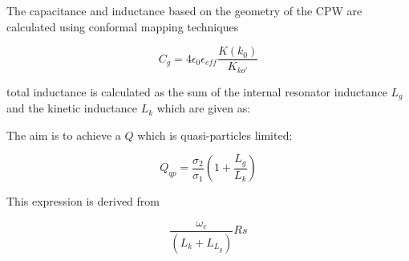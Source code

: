 The capacitance and inductance based on the geometry of the CPW are calculated using conformal mapping techniques 


\begin{equation}
\label{eq:quasilimited1}
C_{g}=4\epsilon_{0}\epsilon_{eff}\frac{K(k_{0})}{K_{ko'}}
\end{equation}








total inductance is calculated as the sum of the internal resonator inductance $L_{g}$ and the kinetic inductance $L_{k}$ which are given as: 




The aim is to achieve a $Q$ which is quasi-particles limited:

\begin{equation}
\label{eq:Qquasilimited}
Q_{qp} = \frac{\sigma_{2}}{\sigma_{1}} \left ( 1 + \frac{L_{g}}{L_{k}} \right )
\end{equation} 



\noindent This expression is derived from 

\begin{equation}
\label{eq:quasilimited1}
\frac{\omega_{c}}{(L_{k}+L_{L_{g}})}{Rs}
\end{equation}


